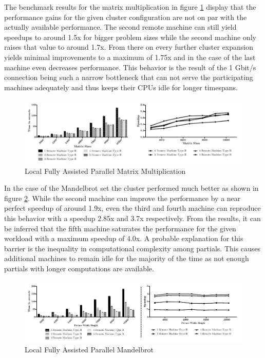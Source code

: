 The benchmark results for the matrix multiplication in figure \ref{img:fully_assisted_parallel_matrix} display that the performance gains for the given cluster configuration are not on par with the actually available performance. The second remote machine can still yield speedups to around 1.5x for bigger problem sizes while the second machine only raises that value to around 1.7x. From there on every further cluster expansion yields minimal improvements to a maximum of 1.75x and in the case of the last machine even decreases performance. This behavior is the result of the 1 Gbit/s connection being such a narrow bottleneck that can not serve the participating machines adequately and thus keeps their CPUs idle for longer timespans.
\begin{figure}[!htb]

	\includegraphics[width=1.0\textwidth]{images/local_fully_assisted_matrix.pdf}
	\centering
	\caption{Local Fully Assisted Parallel Matrix Multiplication}
	\label{img:fully_assisted_parallel_matrix}
\end{figure}

In the case of the Mandelbrot set the cluster performed much better as shown in figure \ref{img:fully_assisted_parallel_mandelbrot}. While the second machine can improve the performance by a near perfect speedup of around 1.9x, even the third and fourth machine can reproduce this behavior with a speedup 2.85x and 3.7x respectively. From the results, it can be inferred that the fifth machine saturates the performance for the given workload with a maximum speedup of 4.0x. A probable explanation for this barrier is the inequality in computational complexity among partials. This causes additional machines to remain idle for the majority of the time as not enough partials with longer computations are available.

\begin{figure}[!htb]

	\includegraphics[width=1.0\textwidth]{images/local_fully_assisted_mandelbrot.pdf}
	\centering
	\caption{Local Fully Assisted Parallel Mandelbrot}
	\label{img:fully_assisted_parallel_mandelbrot}
\end{figure}
